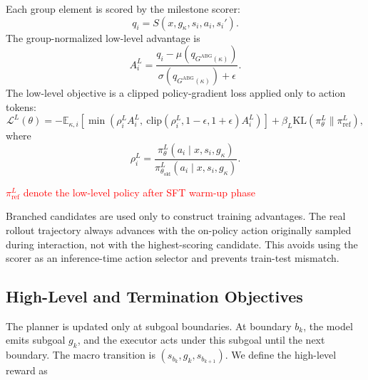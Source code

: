 \documentclass{article}
\newcommand{\wei}[1]{\textcolor{red}{#1}}
\begin{document}
Each group element is scored by the milestone scorer:
\begin{equation}
q_i = S(x,g_\kappa,s_i,a_i,s_i').
\end{equation}
The group-normalized low-level advantage is
\begin{equation}
A_i^L
=
\frac{q_i-\mu(q_{G^{\mathrm{ABG}}(\kappa)})}
{\sigma(q_{G^{\mathrm{ABG}}(\kappa)})+\epsilon}.
\label{eq:low_adv}
\end{equation}
The low-level objective is a clipped policy-gradient loss applied only to action tokens:
\begin{equation}
\mathcal{L}^L(\theta)
=
-\mathbb{E}_{\kappa,i}
\left[
\min
\left(
\rho_i^L A_i^L,\ 
\mathrm{clip}(\rho_i^L,1-\epsilon,1+\epsilon)A_i^L
\right)
\right]
+
\beta_L\mathrm{KL}(\pi_\theta^L\|\pi_{\mathrm{ref}}^L),
\label{eq:low_loss}
\end{equation}
where
\begin{equation}
\rho_i^L
=
\frac{
\pi_\theta^L(a_i\mid x,s_i,g_\kappa)
}{
\pi_{\theta_{\mathrm{old}}}^L(a_i\mid x,s_i,g_\kappa)
}.
\end{equation}

\wei{$\pi_{\mathrm{ref}}^L$ denote the low-level policy after SFT warm-up phase}

Branched candidates are used only to construct training advantages. The real rollout trajectory always advances with the on-policy action originally sampled during interaction, not with the highest-scoring candidate. This avoids using the scorer as an inference-time action selector and prevents train-test mismatch.

\subsection{High-Level and Termination Objectives}

The planner is updated only at subgoal boundaries. At boundary $b_k$, the model emits subgoal $g_k$, and the executor acts under this subgoal until the next boundary. The macro transition is $(s_{b_k},g_k,s_{b_{k+1}})$. We define the high-level reward as 
\end{document}
